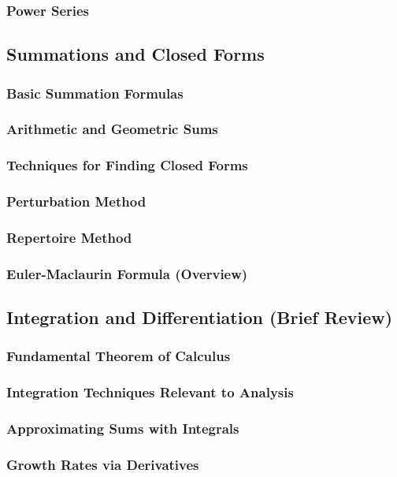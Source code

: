 \subsubsection{Power Series}

\subsection{Summations and Closed Forms}
\subsubsection{Basic Summation Formulas}
\subsubsection{Arithmetic and Geometric Sums}
\subsubsection{Techniques for Finding Closed Forms}
\subsubsection{Perturbation Method}
\subsubsection{Repertoire Method}
\subsubsection{Euler-Maclaurin Formula (Overview)}

\subsection{Integration and Differentiation (Brief Review)}
\subsubsection{Fundamental Theorem of Calculus}
\subsubsection{Integration Techniques Relevant to Analysis}
\subsubsection{Approximating Sums with Integrals}
\subsubsection{Growth Rates via Derivatives}

